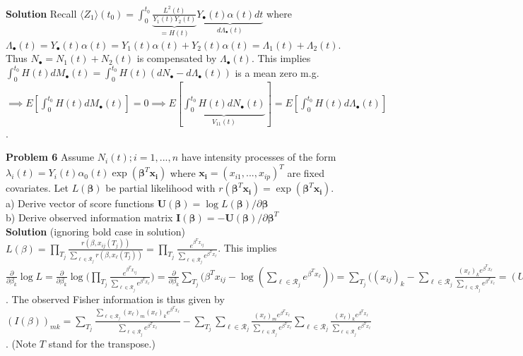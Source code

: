 \documentclass{article}
\begin{document}
\textbf{Solution} Recall $\langle Z_1 \rangle (t_0) = \int_0^{t_0} \underbrace{\frac{L^2(t)}{Y_1(t)Y_2(t)}}_{=H(t)} \underbrace{Y_{\bullet}(t)\alpha(t)dt}_{d\Lambda_{\bullet}(t)}$ where $\Lambda_{\bullet}(t) = Y_{\bullet}(t)\alpha(t) = Y_{1}(t)\alpha(t) + Y_{2}(t)\alpha(t) = \Lambda_{1}(t) + \Lambda_{2}(t)$. Thus $N_{\bullet} = N_{1}(t)+N_{2}(t)$ is compensated by $\Lambda_{\bullet}(t)$. This implies $\int_0^{t_0} H(t) dM_{\bullet} (t) = \int_0^{t_0} H(t) (dN_{\bullet}-d\Lambda_{\bullet}(t))$ is a mean zero m.g. $\implies E[\int_0^{t_0} H(t) dM_{\bullet} (t)] = 0 \implies E[\underbrace{\int_0^{t_0} H(t) dN_{\bullet} (t)}_{V_{11}(t)}] = E[\int_0^{t_0} H(t) d\Lambda_{\bullet} (t)]$.

\textbf{Problem 6} Assume $N_i(t); i=1,...,n$ have intensity processes of the form $\lambda_i(t) = Y_i(t)\alpha_0(t)\exp(\mathbf{\beta}^T\mathbf{x_i})$ where $\mathbf{x_i} = (x_{i1},...,x_{ip})^T$ are fixed covariates. Let $L(\mathbf{\beta})$ be partial likelihood with $r(\mathbf{\beta}^T\mathbf{x_i}) = \exp(\mathbf{\beta}^T\mathbf{x_i})$. \\
a) Derive vector of score functions $\mathbf{U}(\mathbf{\beta}) = \log L(\mathbf{\beta}) / \partial \mathbf{\beta}$ \\
b) Derive observed information matrix $\mathbf{I}(\mathbf{\beta}) = -\mathbf{U}(\mathbf{\beta}) / \partial \mathbf{\beta}^T$ \\
\textbf{Solution} (ignoring bold case in solution) $L(\beta) = \prod_{T_j} \frac{r(\beta, x_{ij}(T_j))}{\sum_{\ell \in \mathcal{R}_j} r(\beta, x_{\ell}(T_j))} =  \prod_{T_j} \frac{e^{\beta^T x_{ij}}}{\sum_{\ell \in \mathcal{R}_j} e^{\beta^T x_{\ell}}}$. This implies $\frac{\partial}{\partial\beta_k}\log L = \frac{\partial}{\partial\beta_k}\log \Big( \prod_{T_j} \frac{e^{\beta^T x_{ij}}}{\sum_{\ell \in \mathcal{R}_j} e^{\beta^T x_{\ell}}} \Big) = 
\frac{\partial}{\partial\beta_k} \sum_{T_j} 
\Big(  \beta^T x_{ij}- \log (\sum_{\ell \in \mathcal{R}_j} e^{\beta^T x_{\ell}}) \Big) =
\sum_{T_j} 
\Big( (x_{ij})_k - \sum_{\ell \in \mathcal{R}_j} \frac{(x_{\ell})_k e^{\beta^T x_{\ell}}}{\sum_{\ell \in \mathcal{R}_j} e^{\beta^T x_{\ell}}} = (U(\beta))_k
$. The observed Fisher information is thus given by \\
$
(I(\beta))_{mk} = \sum_{T_j} \frac{\sum_{\ell \in \mathcal{R}_j} (x_{\ell})_m (x_{\ell})_k e^{\beta^T x_{\ell}}}{\sum_{\ell \in \mathcal{R}_j} e^{\beta^T x_{\ell}}} -
\sum_{T_j} \sum_{\ell \in \mathcal{R}_j}  \frac{(x_{\ell})_m  e^{\beta^T x_{\ell}}}{\sum_{\ell \in \mathcal{R}_j} e^{\beta^T x_{\ell}}} \sum_{\ell \in \mathcal{R}_j} \frac{(x_{\ell})_k  e^{\beta^T x_{\ell}}}{\sum_{\ell \in \mathcal{R}_j} e^{\beta^T x_{\ell}}}
$. (Note $T$ stand for the transpose.)
\end{document}
